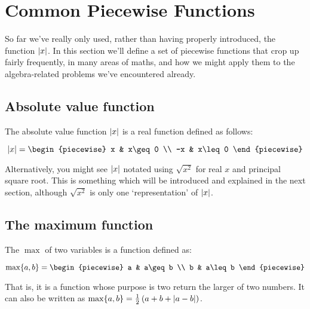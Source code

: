 \section{Common Piecewise Functions}

So far we've really only used, rather than having properly introduced, the function $\abs{x}$. In this section we'll define a set of piecewise functions that crop up fairly frequently, in many areas of maths, and how we might apply them to the algebra-related problems we've encountered already.

\subsection{Absolute value function}
The absolute value function $\abs{x}$ is a real function defined as follows:

$$
    \abs{x}=\begin{piecewise}
        x & x\geq 0 \\
        -x & x\leq 0
    \end{piecewise}
$$

Alternatively, you might see $\abs{x}$ notated using $\sqrt{x^2}$ for real $x$ and principal square root. This is something which will be introduced and explained in the next section, although $\sqrt{x^2}$ is only one `representation' of $\abs{x}$.

\subsection{The maximum function}
\label{section:max}
The $\max$ of two variables is a function defined as:

$$
    \max\br{a,b}=\begin{piecewise}
        a & a\geq b \\
        b & a\leq b
    \end{piecewise}
$$

That is, it is a function whose purpose is two return the larger of two numbers. It can also be written as $\max\{a,b\}=\frac{1}{2}\left(a+b+\abs{a-b}\right)$.

